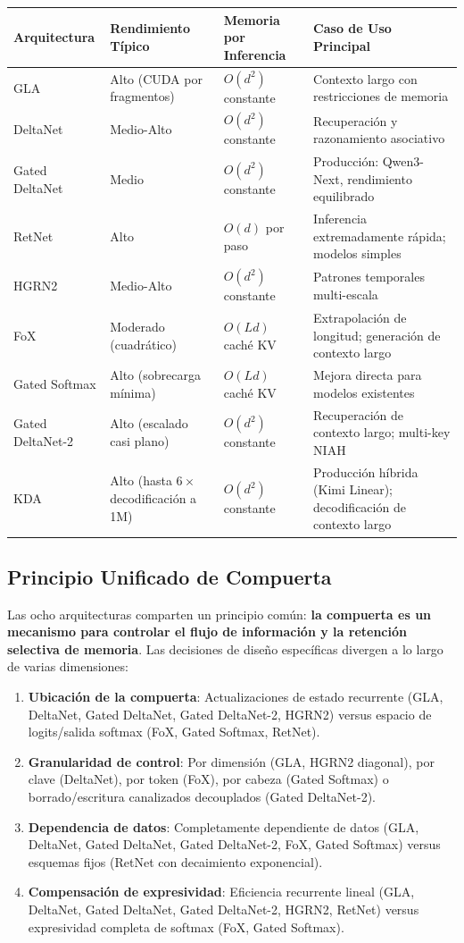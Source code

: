 \footnotesize
\begin{longtable}{p{2.0cm}p{2.4cm}p{2.8cm}p{3.4cm}}
\toprule
\textbf{Arquitectura} & \textbf{Rendimiento Típico} & \textbf{Memoria por Inferencia} & \textbf{Caso de Uso Principal} \\
\midrule
\endhead
GLA & Alto (CUDA por fragmentos) & $O(d^2)$ constante & Contexto largo con restricciones de memoria \\
DeltaNet & Medio-Alto & $O(d^2)$ constante & Recuperación y razonamiento asociativo \\
Gated DeltaNet & Medio & $O(d^2)$ constante & Producción: Qwen3-Next, rendimiento equilibrado \\
RetNet & Alto & $O(d)$ por paso & Inferencia extremadamente rápida; modelos simples \\
HGRN2 & Medio-Alto & $O(d^2)$ constante & Patrones temporales multi-escala \\
FoX & Moderado (cuadrático) & $O(Ld)$ caché KV & Extrapolación de longitud; generación de contexto largo \\
Gated Softmax & Alto (sobrecarga mínima) & $O(Ld)$ caché KV & Mejora directa para modelos existentes \\
Gated DeltaNet-2 & Alto (escalado casi plano) & $O(d^2)$ constante & Recuperación de contexto largo; multi-key NIAH \\
KDA & Alto (hasta $6\times$ decodificación a 1M) & $O(d^2)$ constante & Producción híbrida (Kimi Linear); decodificación de contexto largo \\
\bottomrule
\end{longtable}
\normalsize

\subsection{Principio Unificado de Compuerta}

Las ocho arquitecturas comparten un principio común: \textbf{la compuerta es un mecanismo para controlar el flujo de información y la retención selectiva de memoria}. Las decisiones de diseño específicas divergen a lo largo de varias dimensiones:

\begin{enumerate}[leftmargin=*]
    \item \textbf{Ubicación de la compuerta}: Actualizaciones de estado recurrente (GLA, DeltaNet, Gated DeltaNet, Gated DeltaNet-2, HGRN2) versus espacio de logits/salida softmax (FoX, Gated Softmax, RetNet).
    \item \textbf{Granularidad de control}: Por dimensión (GLA, HGRN2 diagonal), por clave (DeltaNet), por token (FoX), por cabeza (Gated Softmax) o borrado/escritura canalizados decouplados (Gated DeltaNet-2).
    \item \textbf{Dependencia de datos}: Completamente dependiente de datos (GLA, DeltaNet, Gated DeltaNet, Gated DeltaNet-2, FoX, Gated Softmax) versus esquemas fijos (RetNet con decaimiento exponencial).
    \item \textbf{Compensación de expresividad}: Eficiencia recurrente lineal (GLA, DeltaNet, Gated DeltaNet, Gated DeltaNet-2, HGRN2, RetNet) versus expresividad completa de softmax (FoX, Gated Softmax).
\end{enumerate}

